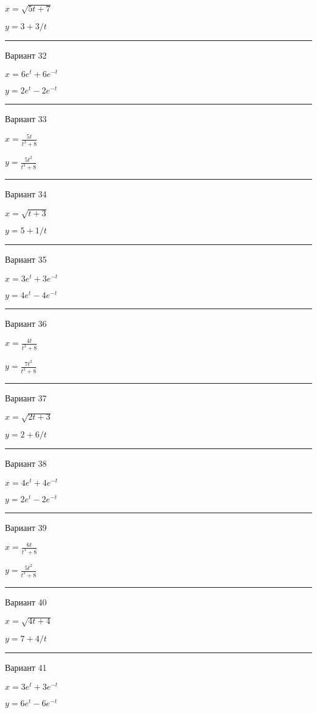\documentclass[11pt]{report}
\begin{document}
$x = \sqrt{5 t + 7}$

$y = 3 + 3 / t$

\rule{\textwidth}{.2mm}

 Вариант 32

$x = 6 e^{t} + 6 e^{- t}$

$y = 2 e^{t} - 2 e^{- t}$

\rule{\textwidth}{.2mm}

 Вариант 33

$x = \frac{5 t}{t^{3} + 8}$

$y = \frac{5 t^{2}}{t^{3} + 8}$

\rule{\textwidth}{.2mm}

 Вариант 34

$x = \sqrt{t + 3}$

$y = 5 + 1 / t$

\rule{\textwidth}{.2mm}

 Вариант 35

$x = 3 e^{t} + 3 e^{- t}$

$y = 4 e^{t} - 4 e^{- t}$

\rule{\textwidth}{.2mm}

 Вариант 36

$x = \frac{4 t}{t^{3} + 8}$

$y = \frac{7 t^{2}}{t^{3} + 8}$

\rule{\textwidth}{.2mm}

 Вариант 37

$x = \sqrt{2 t + 3}$

$y = 2 + 6 / t$

\rule{\textwidth}{.2mm}

 Вариант 38

$x = 4 e^{t} + 4 e^{- t}$

$y = 2 e^{t} - 2 e^{- t}$

\rule{\textwidth}{.2mm}

 Вариант 39

$x = \frac{6 t}{t^{3} + 8}$

$y = \frac{5 t^{2}}{t^{3} + 8}$

\rule{\textwidth}{.2mm}

 Вариант 40

$x = \sqrt{4 t + 4}$

$y = 7 + 4 / t$

\rule{\textwidth}{.2mm}

 Вариант 41

$x = 3 e^{t} + 3 e^{- t}$

$y = 6 e^{t} - 6 e^{- t}$
\end{document}
